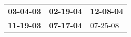 \begin{supertabular}{p{0.33\columnwidth}p{0.33\columnwidth}p{0.33\columnwidth}}
 \textbf{03-04-03\textsuperscript{}} &  \textbf{02-19-04\textsuperscript{}} &  \textbf{12-08-04\textsuperscript{}} \\
 \textbf{11-19-03\textsuperscript{}} &  \textbf{07-17-04\textsuperscript{}} &           07-25-08\textsuperscript{} \\
\end{supertabular}
